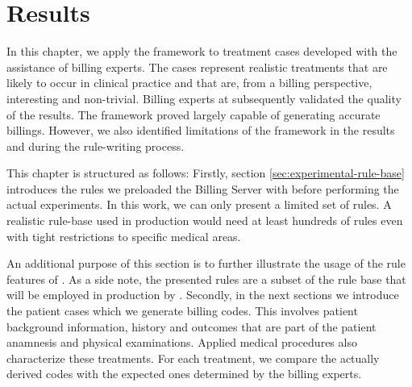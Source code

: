 \chapter{Results}\label{ch:results}
In this chapter, we apply the framework to treatment cases developed with the assistance of billing experts.
The cases represent realistic treatments that are likely to occur in clinical practice and that are, from a billing perspective, interesting and non-trivial.
Billing experts at \AV subsequently validated the quality of the results.
The framework proved largely capable of generating accurate billings.
However, we also identified limitations of the framework in the results and during the rule-writing process.

This chapter is structured as follows:
Firstly, section \ref{sec:experimental-rule-base} introduces the rules we preloaded the Billing Server with before performing the actual experiments.
In this work, we can only present a limited set of rules.
A realistic rule-base used in production would need at least hundreds of rules even with tight restrictions to specific medical areas.

An additional purpose of this section is to further illustrate the usage of the rule features of \RL.
As a side note, the presented rules are a subset of the rule base that will be employed in production by \AV.
Secondly, in the next sections we introduce the patient cases which we generate billing codes.
This involves patient background information, history and outcomes that are part of the patient anamnesis and physical examinations.
Applied medical procedures also characterize these treatments.
For each treatment, we compare the actually derived codes with the expected ones determined by the billing experts.




